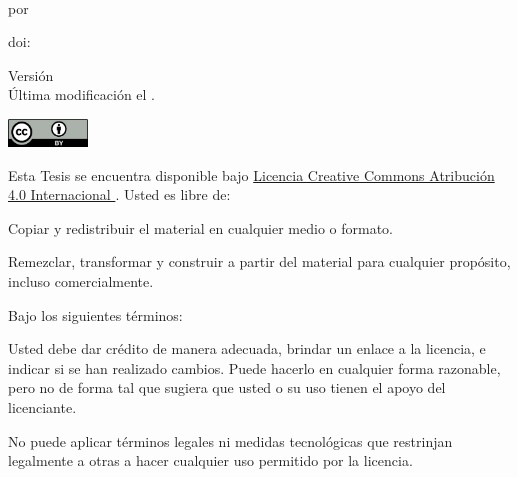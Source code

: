 \vspace*{\fill}

\noindent \textit{\Title{}} \\
por \Soler{}

\noindent doi: \href{https://doi.org/\ThesisDOI}{\ThesisDOI}

\vspace{4em}

\noindent Versión \ThesisVersion{} \\
Última modificación el .

\vspace{5em}

\noindent \includegraphics[height=2em]{figs/logos/cc-by.png}

\noindent Esta Tesis se encuentra disponible bajo
\href{
    https://creativecommons.org/licenses/by/4.0/deed.es
}{
    Licencia Creative Commons Atribución 4.0 Internacional
}.
Usted es libre de:

\begin{description}[labelindent=0.5cm]
    \item[Compartir:]{
        Copiar y redistribuir el material en cualquier medio o formato.
    }
    \item[Adaptar:]{
        Remezclar, transformar y construir a partir del material
        para cualquier propósito, incluso comercialmente.
    }
\end{description}

\noindent Bajo los siguientes términos:

\begin{description}[labelindent=0.5cm]
    \item[Atribución:]{
        Usted debe dar crédito de manera adecuada, brindar un enlace a la
        licencia, e indicar si se han realizado cambios. Puede hacerlo en cualquier
        forma razonable, pero no de forma tal que sugiera que usted o su uso tienen el
        apoyo del licenciante.
    }
    \item[No hay restricciones adicionales:]{
        No puede aplicar términos legales ni medidas tecnológicas que
        restrinjan legalmente a otras a hacer cualquier uso permitido por la
        licencia.
    }
\end{description}
